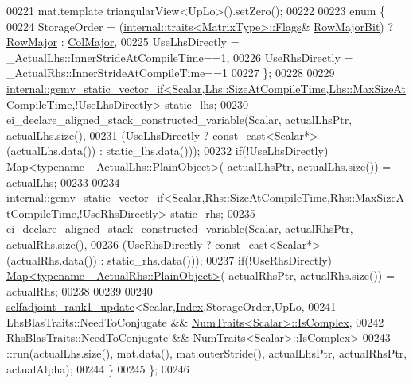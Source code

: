 \begin{DoxyCode}
00221       mat.template triangularView<UpLo>().setZero();
00222 
00223     \textcolor{keyword}{enum} \{
00224       StorageOrder = (\hyperlink{struct_eigen_1_1internal_1_1traits}{internal::traits<MatrixType>::Flags}&
      \hyperlink{group__flags_gae4f56c2a60bbe4bd2e44c5b19cbe8762}{RowMajorBit}) ? \hyperlink{group__enums_ggaacded1a18ae58b0f554751f6cdf9eb13acfcde9cd8677c5f7caf6bd603666aae3}{RowMajor} : \hyperlink{group__enums_ggaacded1a18ae58b0f554751f6cdf9eb13a0cbd4bdd0abcfc0224c5fcb5e4f6669a}{ColMajor},
00225       UseLhsDirectly = \_ActualLhs::InnerStrideAtCompileTime==1,
00226       UseRhsDirectly = \_ActualRhs::InnerStrideAtCompileTime==1
00227     \};
00228     
00229     
      \hyperlink{struct_eigen_1_1internal_1_1gemv__static__vector__if}{internal::gemv\_static\_vector\_if<Scalar,Lhs::SizeAtCompileTime,Lhs::MaxSizeAtCompileTime,!UseLhsDirectly>}
       static\_lhs;
00230     ei\_declare\_aligned\_stack\_constructed\_variable(Scalar, actualLhsPtr, actualLhs.size(),
00231       (UseLhsDirectly ? \textcolor{keyword}{const\_cast<}Scalar*\textcolor{keyword}{>}(actualLhs.data()) : static\_lhs.data()));
00232     \textcolor{keywordflow}{if}(!UseLhsDirectly) \hyperlink{group___core___module_class_eigen_1_1_map}{Map<typename \_ActualLhs::PlainObject>}(
      actualLhsPtr, actualLhs.size()) = actualLhs;
00233     
00234     
      \hyperlink{struct_eigen_1_1internal_1_1gemv__static__vector__if}{internal::gemv\_static\_vector\_if<Scalar,Rhs::SizeAtCompileTime,Rhs::MaxSizeAtCompileTime,!UseRhsDirectly>}
       static\_rhs;
00235     ei\_declare\_aligned\_stack\_constructed\_variable(Scalar, actualRhsPtr, actualRhs.size(),
00236       (UseRhsDirectly ? \textcolor{keyword}{const\_cast<}Scalar*\textcolor{keyword}{>}(actualRhs.data()) : static\_rhs.data()));
00237     \textcolor{keywordflow}{if}(!UseRhsDirectly) \hyperlink{group___core___module_class_eigen_1_1_map}{Map<typename \_ActualRhs::PlainObject>}(
      actualRhsPtr, actualRhs.size()) = actualRhs;
00238     
00239     
00240     \hyperlink{struct_eigen_1_1selfadjoint__rank1__update}{selfadjoint\_rank1\_update}<Scalar,\hyperlink{namespace_eigen_a62e77e0933482dafde8fe197d9a2cfde}{Index},StorageOrder,UpLo,
00241                               LhsBlasTraits::NeedToConjugate && 
      \hyperlink{group___core___module_struct_eigen_1_1_num_traits}{NumTraits<Scalar>::IsComplex},
00242                               RhsBlasTraits::NeedToConjugate && NumTraits<Scalar>::IsComplex>
00243           ::run(actualLhs.size(), mat.data(), mat.outerStride(), actualLhsPtr, actualRhsPtr, actualAlpha);
00244   \}
00245 \};
00246 

\end{DoxyCode}
